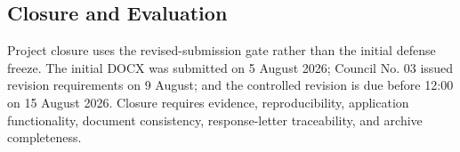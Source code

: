 \documentclass[12pt,a4paper]{report}
\newenvironment{revisionblock}{\begin{snugshade}\noindent}{\end{snugshade}}
\begin{document}
\subsection{\texorpdfstring{\colorbox{RevisionYellow}{Closure and Evaluation}}{Closure and Evaluation}}
\begin{revisionblock}
Project closure uses the revised-submission gate rather than the initial defense freeze. The initial DOCX was submitted on 5 August 2026; Council No. 03 issued revision requirements on 9 August; and the controlled revision is due before 12:00 on 15 August 2026. Closure requires evidence, reproducibility, application functionality, document consistency, response-letter traceability, and archive completeness.
\end{revisionblock}
\begingroup
\footnotesize
\setlength{\tabcolsep}{2pt}
\renewcommand{\arraystretch}{1.16}
\end{document}
